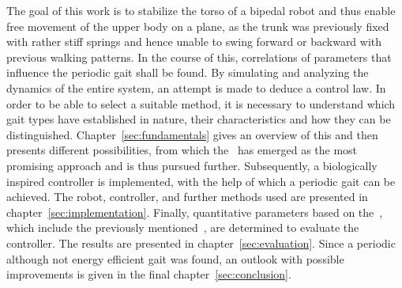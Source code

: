 The goal of this work is to stabilize the torso of a bipedal robot and thus enable free movement of the upper body on a plane, as the trunk was previously fixed with rather stiff springs and hence unable to swing forward or backward with previous walking patterns. In the course of this, correlations of parameters that influence the periodic gait shall be found. By simulating and analyzing the dynamics of the entire system, an attempt is made to deduce a control law. In order to be able to select a suitable method, it is necessary to understand which gait types have established in nature, their characteristics and how they can be distinguished. Chapter~\ref{sec:fundamentals} gives an overview of this and then presents different possibilities, from which the~ has emerged as the most promising approach and is thus pursued further. Subsequently, a biologically inspired controller is implemented, with the help of which a periodic gait can be achieved. The robot, controller, and further methods used are presented in chapter~\ref{sec:implementation}. Finally, quantitative parameters based on the~, which include the previously mentioned~, are determined to evaluate the controller.  The results are presented in chapter~\ref{sec:evaluation}. Since a periodic although not energy efficient gait was found, an outlook with possible improvements is given in the final chapter~\ref{sec:conclusion}.
